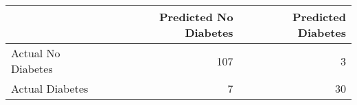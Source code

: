 \begin{tabular}{lrr}
\toprule
 & Predicted No Diabetes & Predicted Diabetes \\
\midrule
Actual No Diabetes & 107 & 3 \\
Actual Diabetes & 7 & 30 \\
\bottomrule
\end{tabular}
